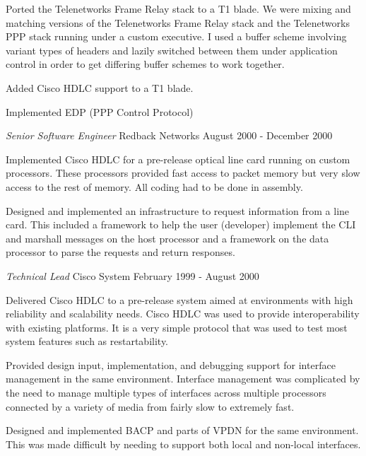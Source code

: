\documentclass[margin]{res}
\begin{document}
\begin{resume}
                Ported the Telenetworks Frame Relay stack to a T1 blade. We were mixing
                and matching versions of the Telenetworks Frame Relay stack and the
                Telenetworks PPP stack running under a custom executive. I used a buffer
                scheme involving variant types of headers and lazily switched between
                them under application control in order to get differing buffer schemes
                to work together.

                Added Cisco HDLC support to a T1 blade.

                Implemented EDP (PPP Control Protocol)

                {\sl Senior Software Engineer} Redback  Networks \hfill August 2000 - December 2000

                Implemented Cisco HDLC for a pre-release optical line card
                running on custom processors. These processors provided
                fast access to packet memory but very slow access to the
                rest of memory. All coding had to be done in assembly.

                Designed and implemented an infrastructure to request
                information from a line card. This included a framework to
                help the user (developer) implement the CLI and marshall
                messages on the host processor and a framework on the data
                processor to parse the requests and return responses.

                {\sl Technical Lead } Cisco System \hfill February 1999 - August 2000

                Delivered Cisco HDLC to a pre-release system aimed at environments with
                high reliability and scalability needs. Cisco HDLC was used to provide
                interoperability with existing platforms. It is a very simple protocol
                that was used to test most system features such as restartability.


                Provided design input, implementation, and debugging support for
                interface management in the same environment. Interface management was
                complicated by the need to manage multiple types of interfaces across
                multiple processors connected by a variety of media from fairly slow to
                extremely fast.

                Designed and implemented BACP and parts of VPDN for the same
                environment. This was made difficult by needing to support both local
                and non-local interfaces.


\end{resume}
\end{document}
